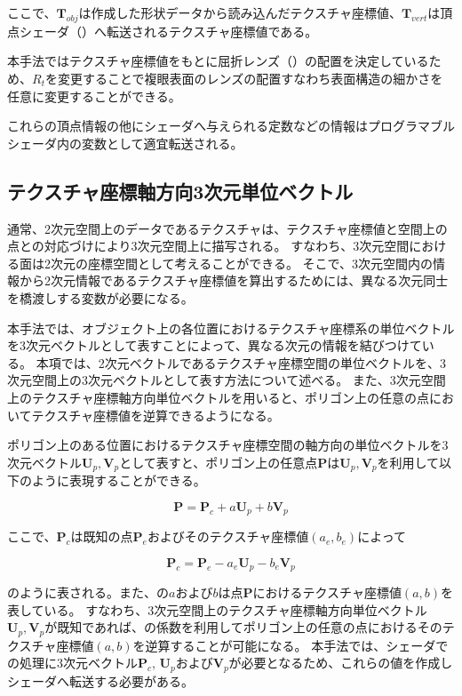 \noindent
ここで、$\bm{T}_{obj}$は作成した形状データから読み込んだテクスチャ座標値、$\bm{T}_{vert}$は頂点シェーダ（）へ転送されるテクスチャ座標値である。

本手法ではテクスチャ座標値をもとに屈折レンズ（）の配置を決定しているため、$R_t$を変更することで複眼表面のレンズの配置すなわち表面構造の細かさを任意に変更することができる。

これらの頂点情報の他にシェーダへ与えられる定数などの情報はプログラマブルシェーダ内の変数として適宜転送される。

\subsection{テクスチャ座標軸方向3次元単位ベクトル}
\label{SSUnitvec}

通常、2次元空間上のデータであるテクスチャは、テクスチャ座標値と空間上の点との対応づけにより3次元空間上に描写される。
すなわち、3次元空間における面は2次元の座標空間として考えることができる\figref{}。
そこで、3次元空間内の情報から2次元情報であるテクスチャ座標値を算出するためには、異なる次元同士を橋渡しする変数が必要になる。

本手法では、オブジェクト上の各位置におけるテクスチャ座標系の単位ベクトルを3次元ベクトルとして表すことによって、異なる次元の情報を結びつけている。
本項では、2次元ベクトルであるテクスチャ座標空間の単位ベクトルを、3次元空間上の3次元ベクトルとして表す方法について述べる。
また、3次元空間上のテクスチャ座標軸方向単位ベクトルを用いると、ポリゴン上の任意の点においてテクスチャ座標値を逆算できるようになる。

ポリゴン上のある位置におけるテクスチャ座標空間の軸方向の単位ベクトルを3次元ベクトル$\bm{U}_p, \bm{V}_p$として表すと、ポリゴン上の任意点$\bm{P}$は$\bm{U}_p, \bm{V}_p$を利用して以下のように表現することができる。

\begin{equation}
\bm{P} = \bm{P}_c + a\bm{U}_p + b\bm{V}_p
\label{EPuv}
\end{equation}

\noindent
ここで、$\bm{P}_c$は既知の点$\bm{P}_e$およびそのテクスチャ座標値$(a_e, b_e)$によって

\begin{equation}
\bm{P}_c = \bm{P}_e - a_e\bm{U}_p - b_e\bm{V}_p
\label{EPc}
\end{equation}

\noindent
{}のように表される。また、の$a$および$b$は点$\bm{P}$におけるテクスチャ座標値$(a, b)$を表している。
すなわち、3次元空間上のテクスチャ座標軸方向単位ベクトル$\bm{U}_p, \bm{V}_p$が既知であれば、の係数を利用してポリゴン上の任意の点におけるそのテクスチャ座標値$(a, b)$を逆算することが可能になる。
本手法では、シェーダでの処理に3次元ベクトル$\bm{P}_c$, $\bm{U}_p$および$\bm{V}_p$が必要となるため、これらの値を作成しシェーダへ転送する必要がある。

